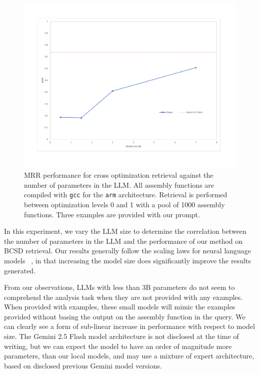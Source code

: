 \begin{figure}[htbp]
\centerline{\includegraphics[width=\linewidth]{size-ablation}}
\caption{MRR performance for cross optimization retrieval against the number of parameters in the LLM. All assembly functions are compiled
with \texttt{gcc} for the \texttt{arm} architecture. Retrieval is performed between optimization levels 0 and 1 with a pool of 1000 assembly functions.
Three examples are provided with our prompt.}
\label{size-abl}
\end{figure}

In this experiment, we vary the LLM size to determine the correlation between the number of parameters in the LLM and the performance
of our method on BCSD retrieval. Our results generally follow the scaling laws for neural language models ~\cite{scaling-laws}, in that increasing
the model size does significantly improve the results generated.

From our observations, LLMs with less than 3B parameters do not seem to comprehend the analysis task when
they are not provided with any examples. When provided with examples, these small models will mimic the examples provided without basing the
output on the assembly function in the query. We can clearly see a form of sub-linear increase in performance with respect to model size.
The Gemini 2.5 Flash model architecture is not disclosed at the time of writing, but we can expect the model to have an order
of magnitude more parameters, than our local models, and may use a mixture of expert architecture, based on disclosed previous Gemini model versions.

